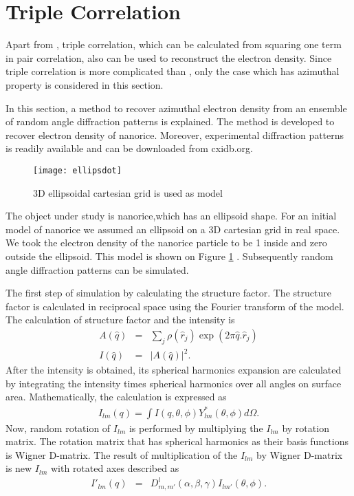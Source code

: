 \section{Triple Correlation}\label{sec:triple}
Apart from \Blq, triple correlation, which can be calculated from squaring one term in pair correlation, also can be used to reconstruct the electron density. Since triple correlation is more complicated than \Blq, only the case which has azimuthal property is considered in this section.

In this section, a method to recover azimuthal electron density from an ensemble of random angle diffraction patterns is explained. The method is developed to recover electron density of nanorice. Moreover, experimental diffraction patterns is readily available and can be downloaded from cxidb.org. \cite{nanokassemeyer}

\begin{figure}[h!]
\centering
 \texttt{[image: ellipsdot]}
\caption{ 3D ellipsoidal cartesian grid is used as model}
\label{fig:ellipsdot}
\end{figure}

The object under study is nanorice,which has an ellipsoid shape. For an initial model of nanorice we assumed an ellipsoid on a 3D cartesian grid in real space. We took the electron density of the nanorice particle to be 1 inside and zero outside the ellipsoid. This model is shown on Figure \ref{fig:ellipsdot} . Subsequently random angle diffraction patterns can be simulated.

The first step of simulation by calculating the structure factor. The structure factor is calculated in reciprocal space using the Fourier transform of the model. The calculation of structure factor and the intensity is
\begin{eqnarray}
A(\hat{q}) &=& \sum_{j} \rho (\hat{r}_{j}) \exp(2 \pi \hat{q}.\hat{r}_{j}) \\
I(\hat{q})&=&|A(\hat{q})|^2. 
\end{eqnarray}
After the intensity is obtained, its spherical harmonics expansion are calculated by integrating the intensity times spherical harmonics over all angles on surface area. Mathematically, the calculation is expressed as 
\begin{eqnarray}
I_{lm}(q) = \int I(q,\theta,\phi) Y_{lm}^{*}(\theta,\phi) d\Omega. 
\label{Ilm}
\end{eqnarray}
Now, random rotation of $I_{lm}$ is performed by multiplying the $I_{lm}$ by rotation matrix. The rotation matrix that has spherical harmonics as their basis functions is Wigner D-matrix. The result of multiplication of the $I_{lm}$ by Wigner D-matrix is new $I_{lm}$ with rotated axes described as  
\begin{eqnarray}
I'_{lm}(q) &=&D^{l}_{m,m'}(\alpha,\beta,\gamma) I_{lm'}^{}(\theta,\phi). \\
\label{IlmD}
\end{eqnarray}

